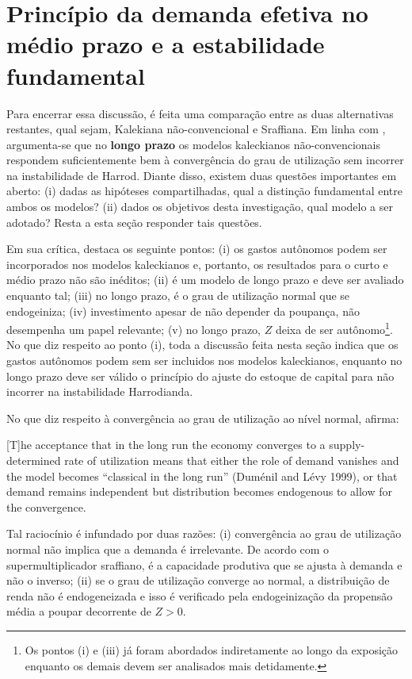 \section{Princípio da demanda efetiva no médio prazo e a estabilidade fundamental}
\label{Medium}


Para encerrar essa discussão, é feita uma comparação entre as duas alternativas restantes, qual sejam, Kalekiana não-convencional e Sraffiana. Em linha com \textcite{fagundes_role_2017}, argumenta-se que no \textbf{longo prazo} os modelos kaleckianos não-convencionais respondem suficientemente bem à convergência do grau de utilização sem incorrer na instabilidade de Harrod. Diante disso, existem duas questões importantes em aberto: (i) dadas as hipóteses compartilhadas, qual a distinção fundamental entre ambos os modelos? (ii) dados os objetivos desta investigação, qual modelo a ser adotado? Resta a esta seção responder tais questões.

Em sua crítica, \textcite{nikiforos_comments_2018} destaca os seguinte pontos: 
(i) os gastos autônomos podem ser incorporados nos modelos kaleckianos e, portanto, os resultados para o curto e médio prazo não são inéditos; 
(ii) é um modelo de longo prazo e deve ser avaliado enquanto tal; 
(iii) no longo prazo, é o grau de utilização normal que se endogeiniza; 
(iv) investimento apesar de não depender da poupança, não desempenha um papel relevante; 
(v) no longo prazo, $Z$ deixa de ser autônomo\footnote{Os pontos (i) e (iii) já foram abordados indiretamente ao longo da exposição enquanto os demais devem ser analisados mais detidamente.}.  No que diz respeito ao ponto (i), toda a discussão feita nesta seção indica que os gastos autônomos podem sem ser incluidos nos modelos kaleckianos, enquanto no longo prazo deve ser válido o princípio do ajuste do estoque de capital para não incorrer na instabilidade Harrodianda. 

No que diz respeito à convergência ao grau de utilização ao nível normal, \citeauthor*{nikiforos_comments_2018} afirma:

\begin{citacao}
	
	[T]he acceptance that in the long run the economy converges to a supply-determined rate of utilization means that either the role of demand vanishes and the model becomes ``classical in the long run'' (Duménil and Lévy 1999), or that demand remains independent but distribution becomes endogenous to allow for the convergence. \cite[p.~9]{nikiforos_comments_2018}
\end{citacao}
Tal raciocínio é infundado por duas razões: (i) convergência ao grau de utilização normal não implica que a demanda é irrelevante. De acordo com o supermultiplicador sraffiano, é a capacidade produtiva que se ajusta à demanda e não o inverso; (ii) se o grau de utilização converge ao normal, a distribuição de renda não é endogeneizada e isso é verificado pela endogeinização da propensão média a poupar decorrente de $Z>0$.

